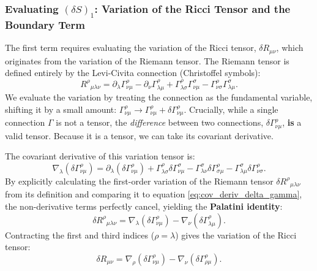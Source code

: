 \documentclass[11pt, a4paper]{report}
\begin{document}
\subsubsection*{Evaluating $(\delta S)_{1}$: Variation of the Ricci Tensor and the Boundary Term}

The first term requires evaluating the variation of the Ricci tensor, $\delta R_{\mu\nu}$, which originates from the variation of the Riemann tensor. The Riemann tensor is defined entirely by the Levi-Civita connection (Christoffel symbols):
\begin{equation}
{R^{\rho}}_{\mu\lambda\nu} = \partial_{\lambda}\Gamma^{\rho}_{\nu\mu} - \partial_{\nu}\Gamma^{\rho}_{\lambda\mu} + \Gamma^{\rho}_{\lambda\sigma}\Gamma^{\sigma}_{\nu\mu} - \Gamma^{\rho}_{\nu\sigma}\Gamma^{\sigma}_{\lambda\mu}.
\end{equation}
We evaluate the variation by treating the connection as the fundamental variable, shifting it by a small amount: $\Gamma^{\rho}_{\nu\mu} \rightarrow \Gamma^{\rho}_{\nu\mu} + \delta\Gamma^{\rho}_{\nu\mu}$. Crucially, while a single connection $\Gamma$ is not a tensor, the \textit{difference} between two connections, $\delta\Gamma^{\rho}_{\nu\mu}$, \textbf{is} a valid tensor. Because it is a tensor, we can take its covariant derivative.

The covariant derivative of this variation tensor is:
\begin{equation}
\label{eq:cov_deriv_delta_gamma}
\nabla_{\lambda}(\delta\Gamma^{\rho}_{\nu\mu}) = \partial_{\lambda}(\delta\Gamma^{\rho}_{\nu\mu}) + \Gamma^{\rho}_{\lambda\sigma}\delta\Gamma^{\sigma}_{\nu\mu} - \Gamma^{\sigma}_{\lambda\nu}\delta\Gamma^{\rho}_{\sigma\mu} - \Gamma^{\sigma}_{\lambda\mu}\delta\Gamma^{\rho}_{\nu\sigma}.
\end{equation}
By explicitly calculating the first-order variation of the Riemann tensor $\delta{R^{\rho}}_{\mu\lambda\nu}$ from its definition and comparing it to equation \eqref{eq:cov_deriv_delta_gamma}, the non-derivative terms perfectly cancel, yielding the \textbf{Palatini identity}:
\begin{equation}
\label{eq:palatini_identity}
\delta{R^{\rho}}_{\mu\lambda\nu} = \nabla_{\lambda}(\delta\Gamma^{\rho}_{\nu\mu}) - \nabla_{\nu}(\delta\Gamma^{\rho}_{\lambda\mu}).
\end{equation}
Contracting the first and third indices ($\rho = \lambda$) gives the variation of the Ricci tensor:
\begin{equation}
\delta R_{\mu\nu} = \nabla_{\rho}(\delta\Gamma^{\rho}_{\nu\mu}) - \nabla_{\nu}(\delta\Gamma^{\rho}_{\rho\mu}).
\end{equation}
\end{document}
